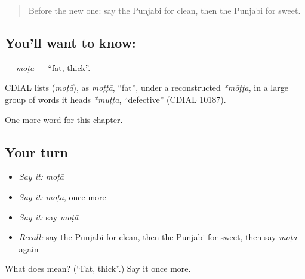 \label{lesson:PA-C82-mota}



\begin{quote}
Before the new one: say the Punjabi for clean, then the Punjabi for sweet.
\end{quote}

\subsection*{You'll want to know: }
\textbf{} — \emph{moṭā} — \textquotedblleft{}fat, thick\textquotedblright{}.

\begin{cousinweb}
CDIAL lists \textbf{} (\emph{moṭā}), as \emph{moṭṭā}, \textquotedblleft{}fat\textquotedblright{}, under a reconstructed \emph{*mōṭṭa}, in a large group of words it heads \emph{*muṭṭa}, \textquotedblleft{}defective\textquotedblright{} (CDIAL 10187).
\end{cousinweb}

\begin{grammarlens}[title={What you've built}]
One more word for this chapter.
\end{grammarlens}

\subsection*{Your turn}
\begin{itemize}
\raggedright
  \item \emph{Say it:} \emph{moṭā}
  \item \emph{Say it:} \emph{moṭā}, once more
  \item \emph{Say it:} say \emph{moṭā}
  \item \emph{Recall:} say the Punjabi for clean, then the Punjabi for sweet, then say \emph{moṭā} again
\end{itemize}

\begin{tcolorbox}[breakable,colback=teal!4,colframe=teal!35!black,title={Before you move on}]
What does  mean? (\textquotedblleft{}Fat, thick\textquotedblright{}.) Say it once more.
\end{tcolorbox}
